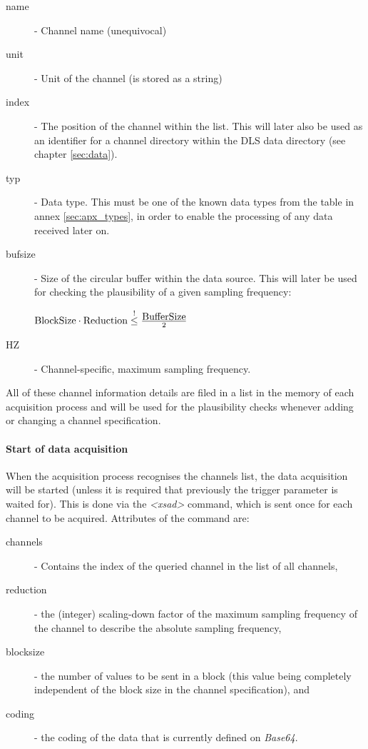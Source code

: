 \documentclass[a4paper,12pt,BCOR6mm,bibtotoc,idxtotoc]{scrbook}
\begin{document}
\begin{description} 
\item[name] - Channel name (unequivocal) 
\item[unit]  - Unit of the channel (is stored as a string) 
\item[index]  - The position of the channel within the list. This will later also be used as an identifier for a channel directory within the DLS data directory (see chapter \ref{sec:data}). 
\item[typ] - Data type. This must be one of the known data types from the table in annex \ref{sec:apx_types}, in order to enable the processing of any data received later on. 
\item[bufsize] - Size of the circular buffer within the data source. This will later be used for checking the plausibility of a given sampling frequency:

$ \hbox{BlockSize} \cdot \hbox{Reduction} \stackrel{!}{\le} \frac{\hbox{BufferSize}}{2} $


\item[HZ] - Channel-specific, maximum sampling frequency. \end{description}

All of these channel information details are filed in a list in the memory of each acquisition process and will be used for the plausibility checks whenever adding or changing a channel specification.

\paragraph{Start of data acquisition} When the acquisition process recognises the channels list, the data acquisition will be started (unless it is required that previously the trigger parameter is waited for). This is done via the \textit{\textless xsad\textgreater} command, which is sent once for each channel to be acquired. Attributes of the command are:

\begin{description} 
\item[channels] - Contains the index of the queried channel in the list of all channels, 
\item[reduction] - the (integer) scaling-down factor of the maximum sampling frequency of the channel to describe the absolute sampling frequency, 
\item[blocksize] - the number of values to be sent in a block (this value being completely independent of the block size in the channel specification), and 
\item[coding] - the coding of the data that is currently defined on \textit{Base64}. \end{description}
\end{document}

